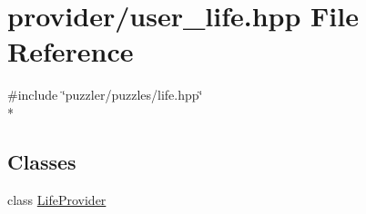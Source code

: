 \hypertarget{a00136}{}\section{provider/user\+\_\+life.hpp File Reference}
\label{a00136}
{\ttfamily \#include \char`\"{}puzzler/puzzles/life.\+hpp\char`\"{}}\\*
\subsection*{Classes}
\begin{DoxyCompactItemize}
\item 
class \hyperlink{a00012}{Life\+Provider}
\end{DoxyCompactItemize}
